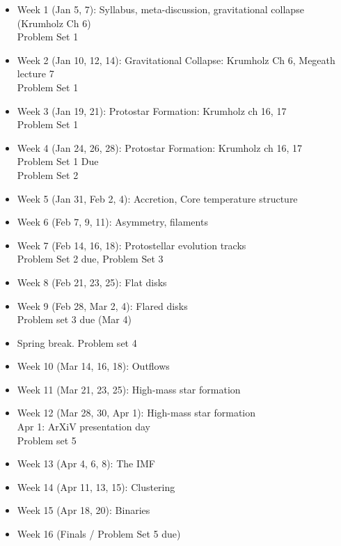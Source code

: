 \documentclass[11pt]{article}
\begin{document}
\begin{itemize}
    \item Week 1 (Jan 5, 7): Syllabus, meta-discussion, gravitational collapse (Krumholz Ch 6) \\
        Problem Set 1
    \item Week 2 (Jan 10, 12, 14): Gravitational Collapse: Krumholz Ch 6, Megeath lecture 7 \\
        Problem Set 1
    \item Week 3 (Jan 19, 21): Protostar Formation: Krumholz ch 16, 17 \\
        Problem Set 1
    \item Week 4 (Jan 24, 26, 28):  Protostar Formation: Krumholz ch 16, 17 \\
        Problem Set 1 Due \\
        Problem Set 2
    \item Week 5 (Jan 31, Feb 2, 4): Accretion, Core temperature structure \\
    \item Week 6 (Feb 7, 9, 11): Asymmetry, filaments \\
    \item Week 7 (Feb 14, 16, 18): Protostellar evolution tracks \\
        Problem Set 2 due, Problem Set 3
    \item Week 8 (Feb 21, 23, 25): Flat disks \\
    \item Week 9 (Feb 28, Mar 2, 4): Flared disks \\
        Problem set 3 due (Mar 4)
    \item Spring break.
        Problem set 4 
    \item Week 10 (Mar 14, 16, 18): Outflows \\
    \item Week 11 (Mar 21, 23, 25): High-mass star formation \\
    \item Week 12 (Mar 28, 30, Apr 1):  High-mass star formation \\
        Apr 1: ArXiV presentation day \\
        Problem set 5 \\
    \item Week 13 (Apr 4, 6, 8): The IMF \\
    \item Week 14 (Apr 11, 13, 15): Clustering \\
    \item Week 15 (Apr 18, 20):  Binaries\\
    \item Week 16 (Finals / Problem Set 5 due)
\end{itemize}
\end{document}
